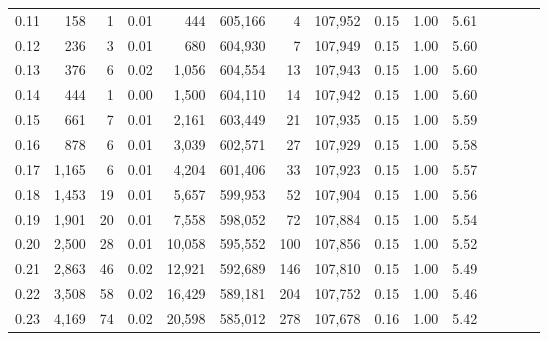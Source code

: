 \begin{tabular}{rrrcrrrrrrrrrrr}
0.11 &     158 &      1 &                                       0.01 &      444 &  605,166 &        4 &  107,952 &  0.15 &  1.00 &                         5.61 \\
0.12 &     236 &      3 &                                       0.01 &      680 &  604,930 &        7 &  107,949 &  0.15 &  1.00 &                         5.60 \\
0.13 &     376 &      6 &                                       0.02 &    1,056 &  604,554 &       13 &  107,943 &  0.15 &  1.00 &                         5.60 \\
0.14 &     444 &      1 &                                       0.00 &    1,500 &  604,110 &       14 &  107,942 &  0.15 &  1.00 &                         5.60 \\
0.15 &     661 &      7 &                                       0.01 &    2,161 &  603,449 &       21 &  107,935 &  0.15 &  1.00 &                         5.59 \\
0.16 &     878 &      6 &                                       0.01 &    3,039 &  602,571 &       27 &  107,929 &  0.15 &  1.00 &                         5.58 \\
0.17 &   1,165 &      6 &                                       0.01 &    4,204 &  601,406 &       33 &  107,923 &  0.15 &  1.00 &                         5.57 \\
0.18 &   1,453 &     19 &                                       0.01 &    5,657 &  599,953 &       52 &  107,904 &  0.15 &  1.00 &                         5.56 \\
0.19 &   1,901 &     20 &                                       0.01 &    7,558 &  598,052 &       72 &  107,884 &  0.15 &  1.00 &                         5.54 \\
0.20 &   2,500 &     28 &                                       0.01 &   10,058 &  595,552 &      100 &  107,856 &  0.15 &  1.00 &                         5.52 \\
0.21 &   2,863 &     46 &                                       0.02 &   12,921 &  592,689 &      146 &  107,810 &  0.15 &  1.00 &                         5.49 \\
0.22 &   3,508 &     58 &                                       0.02 &   16,429 &  589,181 &      204 &  107,752 &  0.15 &  1.00 &                         5.46 \\
0.23 &   4,169 &     74 &                                       0.02 &   20,598 &  585,012 &      278 &  107,678 &  0.16 &  1.00 &                         5.42 \\

\end{tabular}
